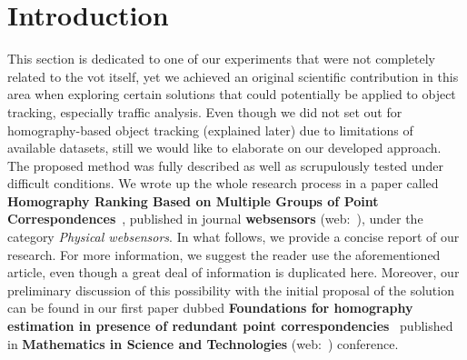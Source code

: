 \section{Introduction}
\label{sec:HomographyIntroduction}

This section is dedicated to one of our experiments that were not completely related to the \gls{vot} itself, yet we achieved an original scientific contribution in this area when exploring certain solutions that could potentially be applied to object tracking, especially traffic analysis. Even though we did not set out for homography-based object tracking (explained later) due to limitations of available datasets, still we would like to elaborate on our developed approach. The proposed method was fully described as well as scrupulously tested under difficult conditions. We wrote up the whole research process in a paper called \textbf{Homography Ranking Based on Multiple Groups of Point Correspondences}~\cite{ondrasovic2021homography}, published in journal \textbf{websensors} (web:~\cite{websensors}), under the category \emph{Physical websensors}. In what follows, we provide a concise report of our research. For more information, we suggest the reader use the aforementioned article, even though a great deal of information is duplicated here. Moreover, our preliminary discussion of this possibility with the initial proposal of the solution can be found in our first paper dubbed \textbf{Foundations for homography estimation in presence of redundant point correspondencies}~\cite{ondrasovic2020foundations} published in \textbf{Mathematics in Science and Technologies} (web:~\cite{webmistconf}) conference.
